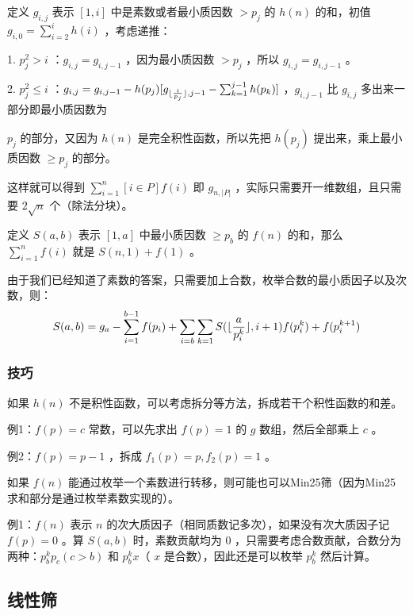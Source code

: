 \vspace{0.2cm}

定义 $g_{i,j}$ 表示 $[1,i]$ 中是素数或者最小质因数 $>p_j$ 的 $h(n)$ 的和，初值 $g_{i,0}=\sum_{i=2}^{i}h(i)$ ，考虑递推：

1. $p_j^2>i$ ：$g_{i,j}=g_{i,j-1}$ ，因为最小质因数 $>p_j$ ，所以 $g_{i,j}=g_{i,j-1}$ 。

2. $p_j^2\le i$ ：$g_{i,j}=g_{i,j-1}-h(p_j)[g_{\lfloor{i\over p_j}\rfloor,j-1}-\sum_{k=1}^{j-1}h(p_k)]$ ，$g_{i,j-1}$ 比 $g_{i,j}$ 多出来一部分即最小质因数为 

\hspace{0.3cm} $p_j$ 的部分，又因为 $h(n)$ 是完全积性函数，所以先把 $h(p_j)$ 提出来，乘上最小质因数 $\ge p_j$ 的部分。

\vspace{0.2cm}

这样就可以得到 $\sum_{i=1}^{n}[i\in P]f(i)$ 即 $g_{n,|P|}$ ，实际只需要开一维数组，且只需要 $2\sqrt n$ 个（除法分块）。

定义 $S(a,b)$ 表示 $[1,a]$ 中最小质因数 $\ge p_b$ 的 $f(n)$ 的和，那么 $\sum_{i=1}^{n}f(i)$ 就是 $S(n,1)+f(1)$ 。

由于我们已经知道了素数的答案，只需要加上合数，枚举合数的最小质因子以及次数，则：
$$
S(a,b)=g_a-\sum_{i=1}^{b-1}f(p_i)+\sum_{i=b}\sum_{k=1}S(\lfloor{a\over p_i^k}\rfloor,i+1)f(p_i^k)+f(p_i^{k+1})
$$

\subsubsection{技巧}

如果 $h(n)$ 不是积性函数，可以考虑拆分等方法，拆成若干个积性函数的和差。

例1：$f(p)=c$ 常数，可以先求出 $f(p)=1$ 的 $g$ 数组，然后全部乘上 $c$ 。

例2：$f(p)=p-1$ ，拆成 $f_1(p)=p,f_2(p)=1$ 。

如果 $f(n)$ 能通过枚举一个素数进行转移，则可能也可以Min25筛（因为Min25求和部分是通过枚举素数实现的）。

例1：$f(n)$ 表示 $n$ 的次大质因子（相同质数记多次），如果没有次大质因子记 $f(p)=0$ 。算 $S(a,b)$ 时，素数贡献均为 $0$ ，只需要考虑合数贡献，合数分为两种：$p_b^kp_c(c>b)$ 和 $p_b^kx$（ $x$ 是合数），因此还是可以枚举 $p_b^k$ 然后计算。



\newpage

\subsection{线性筛}

